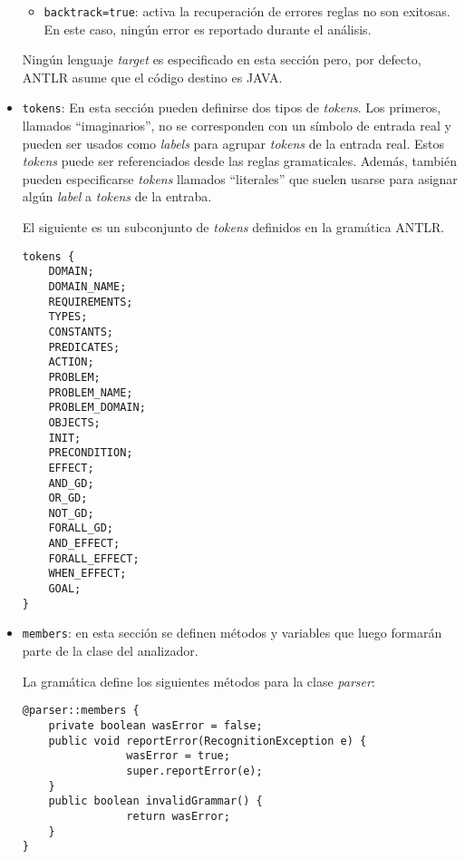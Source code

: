 \begin{itemize}
\begin{ejemplo}
\begin{itemize}
\item \texttt{backtrack=true}: activa
la recuperaci\'on de errores reglas no son
exitosas. En este caso, ning\'un error es reportado durante
el an\'alisis.
\end{itemize}

Ning\'un lenguaje \emph{target} es especificado en esta
secci\'on pero, por defecto, ANTLR asume que el c\'odigo destino
es JAVA.
\end{ejemplo}

\item \texttt{tokens}: En esta secci\'on pueden definirse dos tipos de \emph{tokens}. 
Los primeros, llamados ``i\-ma\-gi\-na\-rios'', no se corresponden con un s\'imbolo de 
entrada real y pueden ser usados como \emph{labels} para agrupar \emph{tokens} 
de la entrada real. Estos \emph{tokens} puede ser referenciados desde
las reglas gramaticales. Adem\'as, tambi\'en pueden especificarse
\emph{tokens} llamados ``literales'' que suelen
usarse para asignar alg\'un \emph{label} a \emph{tokens} de la entraba.

\begin{ejemplo}%

El siguiente es un subconjunto de \emph{tokens} definidos
en la gram\'atica ANTLR.

 \begin{verbatim}
tokens {
    DOMAIN;
    DOMAIN_NAME;
    REQUIREMENTS;
    TYPES;
    CONSTANTS;
    PREDICATES;
    ACTION;
    PROBLEM;
    PROBLEM_NAME;
    PROBLEM_DOMAIN;
    OBJECTS;
    INIT;
    PRECONDITION;
    EFFECT;
    AND_GD;
    OR_GD;
    NOT_GD;
    FORALL_GD;
    AND_EFFECT;
    FORALL_EFFECT;
    WHEN_EFFECT;
    GOAL;
}
 \end{verbatim}
\end{ejemplo}

\item \texttt{members}: en esta secci\'on se definen m\'etodos 
y variables que luego formar\'an parte de la clase del analizador.

\begin{ejemplo}%

La gram\'atica define los siguientes m\'etodos para la clase
\emph{parser}:

 \begin{verbatim}
@parser::members {
    private boolean wasError = false;
    public void reportError(RecognitionException e) {
	            wasError = true;
	            super.reportError(e);
    }
    public boolean invalidGrammar() {
	            return wasError;
    }
}
 \end{verbatim}
\end{ejemplo}


\end{itemize}
